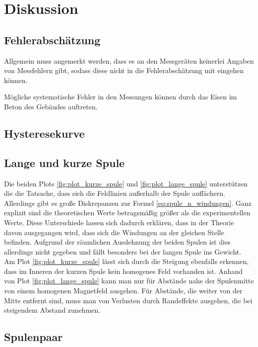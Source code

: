 \section{Diskussion}


\subsection{Fehlerabschätzung}
Allgemein muss angemerkt werden, dass es an den Messgeräten keinerlei Angaben von Messfehlern gibt,
sodass diese nicht in die Fehlerabschätzung mit eingehen können.

\noindent
Mögliche systematische Fehler in den Messungen können durch das Eisen im Beton des Gebäudes auftreten.


\subsection{Hysteresekurve}

\subsection{Lange und kurze Spule}
Die beiden Plots \ref{fig:plot_kurze_spule} und \ref{fig:plot_lange_spule} unterstützen die die Tatsache, 
dass sich die Feldlinien außerhalb der Spule auffächern.
Allerdings gibt es große Diskrepanzen zur Formel \eqref{eq:spule_n_windungen}.
Ganz explizit sind die theoretischen Werte betragsmäßig größer als die experimentellen Werte.
Diese Unterschiede lassen sich dadurch erklären, dass in der Theorie davon ausgegangen wird, dass sich die Windungen an der gleichen Stelle befinden.
Aufgrund der räumlichen Ausdehnung der beiden Spulen ist dies allerdings nicht gegeben und fällt besonders bei der langen Spule ins Gewicht.
Am Plot \ref{fig:plot_kurze_spule} lässt sich durch die Steigung ebenfalls erkennen, dass im Inneren der kurzen Spule kein homogenes Feld vorhanden ist.
Anhand von Plot \ref{fig:plot_lange_spule} kann man nur für Abstände nahe der Spulenmitte von einem homogenen Magnetfeld ausgehen.
Für Abstände, die weiter von der Mitte entfernt sind, muss man von Verlusten durch Randeffekte ausgehen, die bei steigendem Abstand zunehmen.



\subsection{Spulenpaar}


